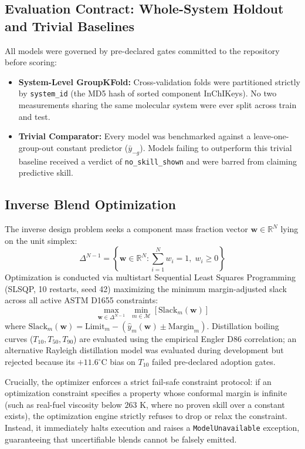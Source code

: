 \documentclass[11pt,a4paper]{article}
\begin{document}
\subsection{Evaluation Contract: Whole-System Holdout and Trivial Baselines}
All models were governed by pre-declared gates committed to the repository before scoring:
\begin{itemize}
    \item \textbf{System-Level GroupKFold:} Cross-validation folds were partitioned strictly by \texttt{system\_id} (the MD5 hash of sorted component InChIKeys). No two measurements sharing the same molecular system were ever split across train and test.
    \item \textbf{Trivial Comparator:} Every model was benchmarked against a leave-one-group-out constant predictor ($\bar{y}_{-g}$). Models failing to outperform this trivial baseline received a verdict of \texttt{no\_skill\_shown} and were barred from claiming predictive skill.
\end{itemize}

\subsection{Inverse Blend Optimization}
The inverse design problem seeks a component mass fraction vector $\mathbf{w} \in \mathbb{R}^N$ lying on the unit simplex:
\begin{equation}
    \Delta^{N-1} = \left\{ \mathbf{w} \in \mathbb{R}^N : \sum_{i=1}^N w_i = 1, \; w_i \ge 0 \right\}
\end{equation}
Optimization is conducted via multistart Sequential Least Squares Programming (SLSQP, 10 restarts, seed 42) maximizing the minimum margin-adjusted slack across all active ASTM D1655 constraints:
\begin{equation}
    \max_{\mathbf{w} \in \Delta^{N-1}} \; \min_{m \in \mathcal{M}} \left[ \text{Slack}_m(\mathbf{w}) \right]
\end{equation}
where $\text{Slack}_m(\mathbf{w}) = \text{Limit}_m - \left( \hat{y}_m(\mathbf{w}) \pm \text{Margin}_m \right)$. Distillation boiling curves ($T_{10}, T_{50}, T_{90}$) are evaluated using the empirical Engler D86 correlation; an alternative Rayleigh distillation model was evaluated during development but rejected because its $+11.6^\circ\text{C}$ bias on $T_{10}$ failed pre-declared adoption gates. 

Crucially, the optimizer enforces a strict fail-safe constraint protocol: if an optimization constraint specifies a property whose conformal margin is infinite (such as real-fuel viscosity below $263\text{ K}$, where no proven skill over a constant exists), the optimization engine strictly refuses to drop or relax the constraint. Instead, it immediately halts execution and raises a \texttt{ModelUnavailable} exception, guaranteeing that uncertifiable blends cannot be falsely emitted.
\end{document}
